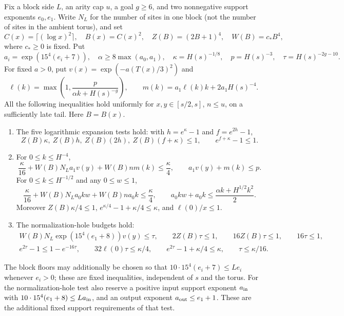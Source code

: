\begin{lemma}
\label{lem:trace-stage-exponential-budgets}
Fix a block side $L$, an arity cap $u$, a goal $g\ge6$, and two
nonnegative support exponents $e_0,e_1$. Write $N_L$ for the number
of sites in one block (not the number of sites in the ambient torus), and set
\[
 C(x)=\lceil(\log x)^2\rceil,\quad B(x)=C(x)^2,\quad
 Z(B)=(2B+1)^4,\quad W(B)=c_*B^4,
\]
where $c_*\ge0$ is fixed. Put
\[
 a_i=\exp(15^4(e_i+7)),\quad
 \alpha\ge8\max(a_0,a_1),\quad
 \kappa=H(s)^{-1/8},\quad p=H(s)^{-3},\quad
 \tau=H(s)^{-2g-10}.
\]
For fixed $a>0$, put $v(x)=\exp(-a(T(x)/3)^2)$ and
\[
 \ell(k)=\max\left(1,\frac{p}{\alpha k+H(s)^{-g}}\right),
 \qquad m(k)=a_1\ell(k)k+2a_1H(s)^{-4}.
\]
All the following inequalities hold uniformly for $x,y\in[s/2,s]$,
$n\le u$, on a sufficiently late tail. Here $B=B(x)$.
\begin{enumerate}
\item The five logarithmic expansion tests hold: with
 $h=e^\kappa-1$ and $f=e^{2h}-1$,
 \[
 Z(B)\kappa,\ Z(B)h,\ Z(B)(2h),\ Z(B)(f+\kappa)\le1,
 \qquad e^{f+\kappa}-1\le1.
 \]
\item For $0\le k\le H^{-4}$,
 \[
 \frac\kappa{16}+W(B)N_La_1v(y)+W(B)nm(k)\le\frac\kappa4,
 \qquad a_1v(y)+m(k)\le p.
 \]
 For $0\le k\le H^{-1/2}$ and any $0\le w\le1$,
 \[
 \frac\kappa{16}+W(B)N_La_0kw+W(B)na_0k\le\frac\kappa4,
 \qquad a_0kw+a_0k\le\frac{\alpha k+H^{1/2}k^2}{2}.
 \]
 Moreover $Z(B)\kappa/4\le1$,
 $e^{\kappa/4}-1+\kappa/4\le\kappa$, and $\ell(0)/x\le1$.
\item The normalization-hole budgets hold:
 \begin{gather*}
 W(B)N_L\exp(15^4(e_1+8))v(y)\le\tau,\qquad
 2Z(B)\tau\le1,\qquad16Z(B)\tau\le1,\qquad16\tau\le1,\\
 e^{2\tau}-1\le1-e^{-16\tau},\qquad
 32\ell(0)\tau\le\kappa/4,\qquad
 e^{2\tau}-1+\kappa/4\le\kappa,\qquad \tau\le\kappa/16.
 \end{gather*}
\end{enumerate}
The block floors may additionally be chosen so that
$10\cdot15^4(e_i+7)\le Le_i$ whenever $e_i>0$;
these are fixed inequalities, independent of $s$ and the torus.
For the normalization-hole test also reserve a positive input support
exponent $a_{\rm in}$ with
$10\cdot15^4(e_1+8)\le La_{\rm in}$, and an output exponent
$a_{\rm out}\le e_1+1$. These are the additional fixed support
requirements of that test.
\end{lemma}
